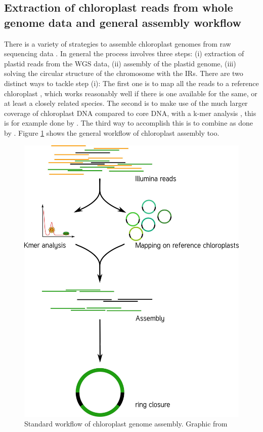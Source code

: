 \subsection{Extraction of chloroplast reads from whole genome data and general assembly workflow}
There is a variety of strategies to assemble chloroplast genomes from raw sequencing data
\cite{twyford_strategies_2017}. In general the process involves three steps: (i) extraction of plastid reads
from the WGS data, (ii) assembly of the plastid genome, (iii) solving the circular structure of the chromosome
with the IRs. There are two distinct ways to tackle step (i): The first one is to map all the reads to a
reference chloroplast \cite{Vinga2012}, which works reasonably well if there is one available for the same, or
at least a closely related species. The second is to make use of the much larger coverage of chloroplast DNA
compared to core DNA, with a k-mer analysis \cite{Chan2013}, this is for example done by \ce
\cite{j_ankenbrand_chloroextractor:_2018}. The third way to accomplish this is to combine as done by \np
\cite{dierckxsens_novoplasty:_2017}.  Figure \ref{fig:cpast_workflow} shows the general workflow of
chloroplast assembly too.


\begin{figure}[H]
\centering
\includegraphics[height=.65\textheight, width=.95\textwidth]{Figures/CE_workflow}
\decoRule
\caption[Chloroplast genome assembly workflow]{Standard workflow of chloroplast genome assembly. Graphic from \cite{j_ankenbrand_chloroextractor:_2018} }
\label{fig:cpast_workflow}
\end{figure}


